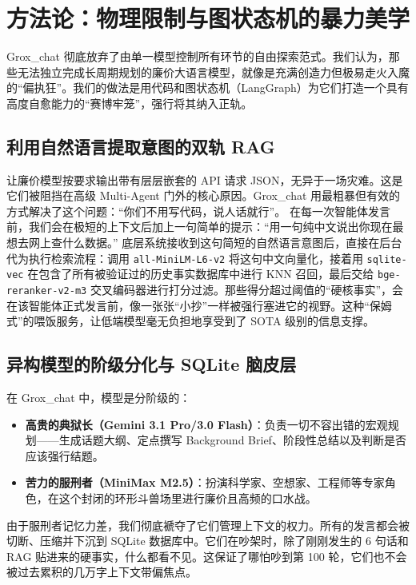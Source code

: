 \section{方法论：物理限制与图状态机的暴力美学}
\label{sec:methodology}

Grox\_chat 彻底放弃了由单一模型控制所有环节的自由探索范式。我们认为，那些无法独立完成长周期规划的廉价大语言模型，就像是充满创造力但极易走火入魔的“偏执狂”。我们的做法是用代码和图状态机（LangGraph）为它们打造一个具有高度自愈能力的“赛博牢笼”，强行将其纳入正轨。

\subsection{利用自然语言提取意图的双轨 RAG}
让廉价模型按要求输出带有层层嵌套的 API 请求 JSON，无异于一场灾难。这是它们被阻挡在高级 Multi-Agent 门外的核心原因。Grox\_chat 用最粗暴但有效的方式解决了这个问题：“你们不用写代码，说人话就行”。
在每一次智能体发言前，我们会在极短的上下文后加上一句简单的提示：“用一句纯中文说出你现在最想去网上查什么数据。”
底层系统接收到这句简短的自然语言意图后，直接在后台代为执行检索流程：调用 \texttt{all-MiniLM-L6-v2} 将这句中文向量化，接着用 \texttt{sqlite-vec} 在包含了所有被验证过的历史事实数据库中进行 KNN 召回，最后交给 \texttt{bge-reranker-v2-m3} 交叉编码器进行打分过滤。那些得分超过阈值的“硬核事实”，会在该智能体正式发言前，像一张张“小抄”一样被强行塞进它的视野。这种“保姆式”的喂饭服务，让低端模型毫无负担地享受到了 SOTA 级别的信息支撑。

\subsection{异构模型的阶级分化与 SQLite 脑皮层}
在 Grox\_chat 中，模型是分阶级的：
\begin{itemize}
    \item \textbf{高贵的典狱长（Gemini 3.1 Pro/3.0 Flash）}：负责一切不容出错的宏观规划——生成话题大纲、定点撰写 Background Brief、阶段性总结以及判断是否应该强行结题。
    \item \textbf{苦力的服刑者（MiniMax M2.5）}：扮演科学家、空想家、工程师等专家角色，在这个封闭的环形斗兽场里进行廉价且高频的口水战。
\end{itemize}
由于服刑者记忆力差，我们彻底褫夺了它们管理上下文的权力。所有的发言都会被切断、压缩并下沉到 SQLite 数据库中。它们在吵架时，除了刚刚发生的 6 句话和 RAG 贴进来的硬事实，什么都看不见。这保证了哪怕吵到第 100 轮，它们也不会被过去累积的几万字上下文带偏焦点。

